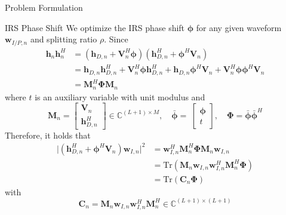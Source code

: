 \documentclass{IEEEtran}
\begin{document}
\begin{section}{Problem Formulation}
	\begin{subsection}{IRS Phase Shift}
		We optimize the IRS phase shift $\boldsymbol{\phi}$ for any given waveform $\boldsymbol{w}_{I/P,n}$ and splitting ratio $\rho$. Since
		\begin{equation}\label{eq:h_n_outer_product}
			\begin{split}
				\boldsymbol{h}_n\boldsymbol{h}_n^H
				&=(\boldsymbol{h}_{D,n}+\boldsymbol{V}_n^H\boldsymbol{\phi})(\boldsymbol{h}_{D,n}^H+\boldsymbol{\phi}^H\boldsymbol{V}_n)\\
				&=\boldsymbol{h}_{D,n}\boldsymbol{h}_{D,n}^H+\boldsymbol{V}_n^H\boldsymbol{\phi}\boldsymbol{h}_{D,n}^H+\boldsymbol{h}_{D,n}\boldsymbol{\phi}^H\boldsymbol{V}_n+\boldsymbol{V}_n^H\boldsymbol{\phi}\boldsymbol{\phi}^H\boldsymbol{V}_n\\
				&=\boldsymbol{M}_n^H\boldsymbol{\Phi}\boldsymbol{M}_n
			\end{split}
		\end{equation}
		where $t$ is an auxiliary variable with unit modulus and
		\begin{equation}\label{eq:M_n,phi}
			\boldsymbol{M}_n=
			\begin{bmatrix}
				\boldsymbol{V}_n \\
				\boldsymbol{h}_{D,n}^H
			\end{bmatrix} \in \mathbb{C}^{(L+1) \times M},
			\quad \bar{\boldsymbol{\phi}}=\
			\begin{bmatrix}
				\boldsymbol{\phi} \\
				t
			\end{bmatrix},
			\quad \boldsymbol{\Phi}=\bar{\boldsymbol{\phi}}\bar{\boldsymbol{\phi}}^H
		\end{equation}
		Therefore, it holds that
		\begin{equation}
			\begin{split}
				\lvert(\boldsymbol{h}_{D,n}^H+\boldsymbol{\phi}^H\boldsymbol{V}_n)\boldsymbol{w}_{I,n}\rvert^2
				&=\boldsymbol{w}_{I,n}^H\boldsymbol{M}_n^H\boldsymbol{\Phi}\boldsymbol{M}_n\boldsymbol{w}_{I,n}\\
				&=\mathrm{Tr}(\boldsymbol{M}_n\boldsymbol{w}_{I,n}\boldsymbol{w}_{I,n}^H\boldsymbol{M}_n^H\boldsymbol{\Phi})\\
				&=\mathrm{Tr}(\boldsymbol{C}_n\boldsymbol{\Phi})
			\end{split}
		\end{equation}
		with
		\begin{equation}\label{eq:C_n}
			\boldsymbol{C}_n = \boldsymbol{M}_n\boldsymbol{w}_{I,n}\boldsymbol{w}_{I,n}^H\boldsymbol{M}_n^H \in \mathbb{C}^{(L+1)\times(L+1)}

\end{equation}
\end{subsection}
\end{section}
\end{document}
